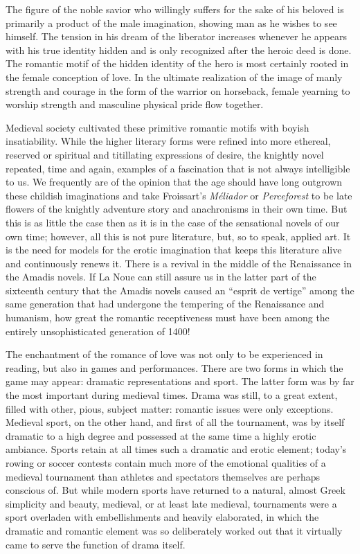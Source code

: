 The figure of the noble savior who willingly suffers for the sake of his
beloved is primarily a product of the male imagination, showing man as
he wishes to see himself. The tension in his dream of the liberator
increases whenever he appears with his true identity hidden and is only
recognized after the heroic deed is done. The romantic motif of the
hidden identity of the hero is most certainly rooted in the female
conception of love. In the ultimate realization of the image of manly
strength and courage in the form of the warrior on horseback, female
yearning to worship strength and masculine physical pride flow together.

Medieval society cultivated these primitive romantic motifs with boyish
insatiability. While the higher literary forms were refined into more
ethereal, reserved or spiritual and titillating expressions of desire,
the knightly novel repeated, time and again, examples of a fascination
that is not always intelligible to us. We frequently are of the opinion
that the age should have long outgrown these childish imaginations and
take Froissart's \emph{Méliador} or \emph{Perceforest} to be late
flowers of the knightly adventure story and anachronisms in their own
time. But this is as little the case then as it is in the case of the
sensational novels of our own time; however, all this is not pure
literature, but, so to speak, applied art. It is the need for models for
the erotic imagination that keeps this literature alive and continuously
renews it. There is a revival in the middle of the Renaissance in the
Amadis novels. If La Noue can still assure us in the latter part of the
sixteenth century that the Amadis novels caused an ``esprit de vertige''
among the same generation that had undergone the tempering of the
Renaissance and humanism, how
\protect\hypertarget{10_Chapter_Three__THE_HEROIC_DREAM.xhtmlux5cux23page_85}{}{}great
the romantic receptiveness must have been among the entirely
unsophisticated generation of 1400!

The enchantment of the romance of love was not only to be experienced in
reading, but also in games and performances. There are two forms in
which the game may appear: dramatic representations and sport. The
latter form was by far the most important during medieval times. Drama
was still, to a great extent, filled with other, pious, subject matter:
romantic issues were only exceptions. Medieval sport, on the other hand,
and first of all the tournament, was by itself dramatic to a high degree
and possessed at the same time a highly erotic ambiance. Sports retain
at all times such a dramatic and erotic element; today's rowing or
soccer contests contain much more of the emotional qualities of a
medieval tournament than athletes and spectators themselves are perhaps
conscious of. But while modern sports have returned to a natural, almost
Greek simplicity and beauty, medieval, or at least late medieval,
tournaments were a sport overladen with embellishments and heavily
elaborated, in which the dramatic and romantic element was so
deliberately worked out that it virtually came to serve the function of
drama itself.

